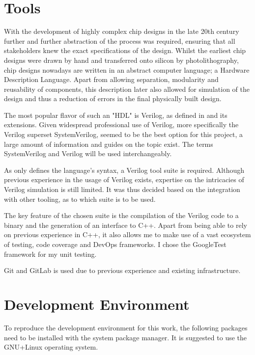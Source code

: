 \section{Tools}
With the development of highly complex chip designs in the late 20th century further and further abstraction of the process was required, ensuring that all stakeholders knew the exact specifications of the design. \cite{1214355} Whilst the earliest chip designs were drawn by hand and transferred onto silicon by photolithography, chip designs nowadays are written in an abstract computer language; a Hardware Description Language. Apart from allowing separation, modularity and reusability of components, this description later also allowed for simulation of the design and thus a reduction of errors in the final physically built design. 

The most popular flavor of such an "HDL" is Verilog, as defined in \cite{10458102} and its extensions. Given widespread professional use of Verilog, more specifically the Verilog superset SystemVerilog, seemed to be the best option for this project, a large amount of information and guides on the topic exist. The terms SystemVerilog and Verilog will be used interchangeably. 

As \cite{10458102} only defines the language's syntax, a Verilog tool suite is required. Although previous experience in the usage of Verilog exists, expertise on the intricacies of Verilog simulation is still limited. It was thus decided based on the integration with other tooling, as to which suite is to be used. 

The key feature of the chosen suite is the compilation of the Verilog code to a binary and the generation of an interface to C++. Apart from being able to rely on previous experience in C++, it also allows me to make use of a vast ecosystem of testing, code coverage and DevOps frameworks. I chose the GoogleTest framework for my unit testing. 

Git and GitLab is used due to previous experience and existing infrastructure.



\section{Development Environment}
To reproduce the development environment for this work, the following packages need to be installed with the system package manager. It is suggested to use the GNU+Linux operating system. 

